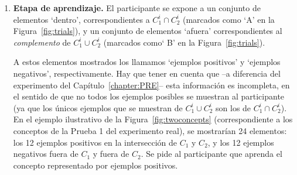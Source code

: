 \begin{enumerate}
    \item \label{item:LearningStage}{\bf Etapa de aprendizaje.} El participante se expone a un conjunto de elementos `dentro', correspondientes a $ C^i_1\cap C^i_2$ (marcados como `{\sf A}' en la Figura~\ref{fig:trials}), y un conjunto de elementos `afuera' correspondientes al {\em complemento} de $C^i_1\cup C^i_2$ (marcados como` {\sf B}' en la Figura~\ref{fig:trials}).

    
	A estos elementos mostrados los llamamos `ejemplos positivos' y `ejemplos negativos', respectivamente. Hay que tener en cuenta que --a diferencia del experimento del Capítulo~\ref{chapter:PRE}-- esta información es incompleta, en el sentido de que no todos los ejemplos posibles se muestran al participante (ya que los únicos ejemplos que se muestran de $C^i_1 \cup C^i_2$ son los de $C^i_1 \cap C^i_2$). En el ejemplo ilustrativo de la Figura~\ref{fig:twoconcepts} (correspondiente a los conceptos de la Prueba 1 del experimento real), se mostrarían 24 elementos: los 12 ejemplos positivos en la intersección de $C_1$ y $C_2$, y los 12 ejemplos negativos fuera de $C_1$ y fuera de $C_2$. Se pide al participante que aprenda el concepto representado por ejemplos positivos.


\end{enumerate}
